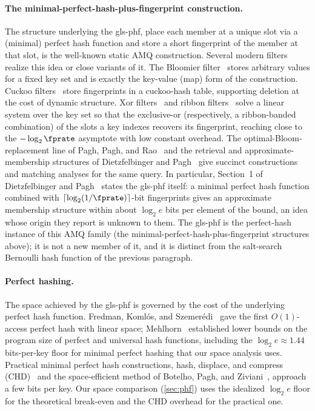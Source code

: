 \documentclass[ ../main.tex]{subfiles}
\begin{document}
\paragraph{The minimal-perfect-hash-plus-fingerprint construction.}
The structure underlying the \gls{gls-phf}, place each member at a unique slot via a (minimal) perfect hash function and store a short fingerprint of the member at that slot, is the well-known static AMQ construction. Several modern filters realize this idea or close variants of it. The Bloomier filter~\cite{bloomier} stores arbitrary values for a fixed key set and is exactly the key-value (map) form of the construction. Cuckoo filters~\cite{fan2014} store fingerprints in a cuckoo-hash table, supporting deletion at the cost of dynamic structure. Xor filters~\cite{graf2020} and ribbon filters~\cite{dillinger2021} solve a linear system over the key set so that the exclusive-or (respectively, a ribbon-banded combination) of the slots a key indexes recovers its fingerprint, reaching close to the $-\log_2 \fprate$ asymptote with low constant overhead. The optimal-Bloom-replacement line of Pagh, Pagh, and Rao~\cite{pagh2005} and the retrieval and approximate-membership structures of Dietzfelbinger and Pagh~\cite{dietzfelbinger2008} give succinct constructions and matching analyses for the same query. In particular, Section~1 of Dietzfelbinger and Pagh~\cite{dietzfelbinger2008} states the \gls{gls-phf} itself: a minimal perfect hash function combined with $\lceil\log_2(1/\fprate)\rceil$-bit fingerprints gives an approximate membership structure within about $\log_2 e$ bits per element of the bound, an idea whose origin they report is unknown to them. The \gls{gls-phf} is the perfect-hash instance of this AMQ family (the minimal-perfect-hash-plus-fingerprint structures above); it is not a new member of it, and it is distinct from the salt-search Bernoulli hash function of the previous paragraph.

\paragraph{Perfect hashing.}
The space achieved by the \gls{gls-phf} is governed by the cost of the underlying perfect hash function. Fredman, Koml\'os, and Szemer\'edi~\cite{fks} gave the first $O(1)$-access perfect hash with linear space; Mehlhorn~\cite{mehlhorn1982} established lower bounds on the program size of perfect and universal hash functions, including the $\log_2 e \approx 1.44$ bits-per-key floor for minimal perfect hashing that our space analysis uses. Practical minimal perfect hash constructions, hash, displace, and compress (CHD)~\cite{chd} and the space-efficient method of Botelho, Pagh, and Ziviani~\cite{simple}, approach a few bits per key. Our space comparison (\cref{sec:phf}) uses the idealized $\log_2 e$ floor for the theoretical break-even and the CHD overhead for the practical one.
\end{document}
